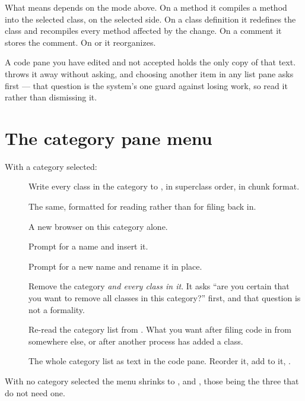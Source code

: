 What  means depends on the mode above. On a method it compiles a
method into the selected class, on the selected side. On a class definition it
redefines the class and recompiles every method affected by the change. On a
comment it stores the comment. On  or  it
reorganizes.

\begin{stwarn}
A code pane you have edited and not accepted holds the only copy of that text.
 throws it away without asking, and choosing another item in any
list pane asks first --- that question is the system's one guard against
losing work, so read it rather than dismissing it.
\end{stwarn}

\section{The category pane menu}

With a category selected:

\begin{description}
\item[] Write every class in the category to
  , in superclass order, in chunk format.
\item[] The same, formatted for reading rather than for filing
  back in.
\item[] A new browser on this category alone.
\item[] Prompt for a name and insert it.
\item[] Prompt for a new name and rename it in place.
\item[] Remove the category \emph{and every class in it}. It asks
  ``are you certain that you want to remove all classes in this category?''
  first, and that question is not a formality.
\item[] Re-read the category list from .
  What you want after filing code in from somewhere else, or after another
  process has added a class.
\item[] The whole category list as text in the code pane.
  Reorder it, add to it, .
\end{description}

With no category selected the menu shrinks to ,
 and , those being the three that do not need one.

